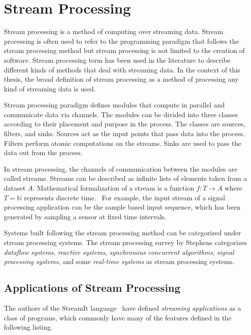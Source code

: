 \section{Stream Processing}
\label{sec:stream-processing}
Stream processing is a method of computing over streaming data. Stream processing is often used to refer to the programming paradigm that follows the stream processing method but stream processing is not limited to the creation of software. Stream processing term has been used in the literature to describe different kinds of methods that deal with streaming data. In the context of this thesis, the broad definition of stream processing as a method of processing any kind of streaming data is used.

Stream processing paradigm defines modules that compute in parallel and communicate data via channels. The modules can be divided into three classes according to their placement and purpose in the process. The classes are sources, filters, and sinks. Sources act as the input points that pass data into the process. Filters perform atomic computations on the streams. Sinks are used to pass the data out from the process.~\cite{stephens1997survey}

In stream processing, the channels of communication between the modules are called streams. Streams can be described as infinite lists of elements taken from a dataset $A$. Mathematical formalization of a stream is a function $f:T \rightarrow A$ where $T = \mathbb{N}$ represents discrete time.~\cite{stephens1997survey} For example, the input stream of a signal processing application can be the sample based input sequence, which has been generated by sampling a sensor at fixed time intervals.

Systems built following the stream processing method can be categorized under stream processing systems. The stream processing survey by Stephens \cite{stephens1997survey} categorizes \textit{dataflow systems}, \textit{reactive systems}, \textit{synchronous concurrent algorithms}, \textit{signal processing systems}, and some \textit{real-time systems} as stream processing systems.

\subsection{Applications of Stream Processing}
\label{subsec:streaming-applications}
The authors of the StreamIt language~\cite{thies2002streamit} have defined \textit{streaming applications} as a class of programs, which commonly have many of the features defined in the following listing.

